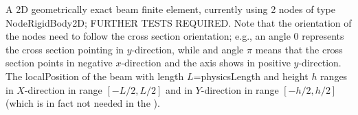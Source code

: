 \ei

%
\newpage


\label{sec:item:ObjectBeamGeometricallyExact2D}
A 2D geometrically exact beam finite element, currently using 2 nodes of type NodeRigidBody2D; FURTHER TESTS REQUIRED. Note that the orientation of the nodes need to follow the cross section orientation; e.g., an angle 0 represents the cross section pointing in $y$-direction, while and angle $\pi$ means that the cross section points in negative $x$-direction and the axis shows in positive $y$-direction. The localPosition of the beam with length $L$=physicsLength and height $h$ ranges in $X$-direction in range $[-L/2, L/2]$ and in $Y$-direction in range $[-h/2,h/2]$ (which is in fact not needed in the ).
\vspace{12pt}\\

